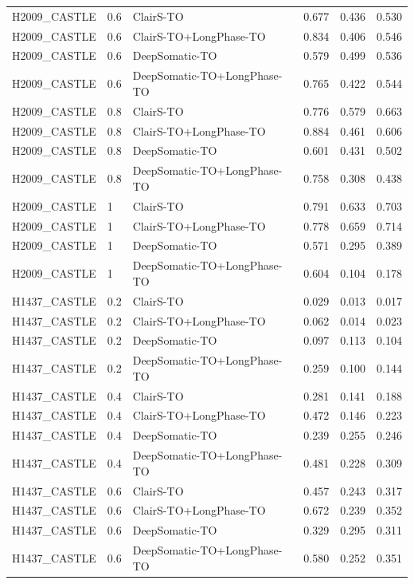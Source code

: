\documentclass[pdflatex,sn-nature]{sn-jnl}
\begin{document}
{\begin{longtable}{@{}lllccc@{}}
  H2009\_CASTLE & 0.6 & ClairS-TO & 0.677 & 0.436 & 0.530 \\
  H2009\_CASTLE & 0.6 & ClairS-TO+LongPhase-TO & 0.834 & 0.406 & 0.546 \\
  H2009\_CASTLE & 0.6 & DeepSomatic-TO & 0.579 & 0.499 & 0.536 \\
  H2009\_CASTLE & 0.6 & DeepSomatic-TO+LongPhase-TO & 0.765 & 0.422 & 0.544 \\
  H2009\_CASTLE & 0.8 & ClairS-TO & 0.776 & 0.579 & 0.663 \\
  H2009\_CASTLE & 0.8 & ClairS-TO+LongPhase-TO & 0.884 & 0.461 & 0.606 \\
  H2009\_CASTLE & 0.8 & DeepSomatic-TO & 0.601 & 0.431 & 0.502 \\
  H2009\_CASTLE & 0.8 & DeepSomatic-TO+LongPhase-TO & 0.758 & 0.308 & 0.438 \\
  H2009\_CASTLE & 1 & ClairS-TO & 0.791 & 0.633 & 0.703 \\
  H2009\_CASTLE & 1 & ClairS-TO+LongPhase-TO & 0.778 & 0.659 & 0.714 \\
  H2009\_CASTLE & 1 & DeepSomatic-TO & 0.571 & 0.295 & 0.389 \\
  H2009\_CASTLE & 1 & DeepSomatic-TO+LongPhase-TO & 0.604 & 0.104 & 0.178 \\
  \addlinespace
  H1437\_CASTLE & 0.2 & ClairS-TO & 0.029 & 0.013 & 0.017 \\
  H1437\_CASTLE & 0.2 & ClairS-TO+LongPhase-TO & 0.062 & 0.014 & 0.023 \\
  H1437\_CASTLE & 0.2 & DeepSomatic-TO & 0.097 & 0.113 & 0.104 \\
  H1437\_CASTLE & 0.2 & DeepSomatic-TO+LongPhase-TO & 0.259 & 0.100 & 0.144 \\
  H1437\_CASTLE & 0.4 & ClairS-TO & 0.281 & 0.141 & 0.188 \\
  H1437\_CASTLE & 0.4 & ClairS-TO+LongPhase-TO & 0.472 & 0.146 & 0.223 \\
  H1437\_CASTLE & 0.4 & DeepSomatic-TO & 0.239 & 0.255 & 0.246 \\
  H1437\_CASTLE & 0.4 & DeepSomatic-TO+LongPhase-TO & 0.481 & 0.228 & 0.309 \\
  H1437\_CASTLE & 0.6 & ClairS-TO & 0.457 & 0.243 & 0.317 \\
  H1437\_CASTLE & 0.6 & ClairS-TO+LongPhase-TO & 0.672 & 0.239 & 0.352 \\
  H1437\_CASTLE & 0.6 & DeepSomatic-TO & 0.329 & 0.295 & 0.311 \\
  H1437\_CASTLE & 0.6 & DeepSomatic-TO+LongPhase-TO & 0.580 & 0.252 & 0.351 \\

\end{longtable}}
\end{document}
